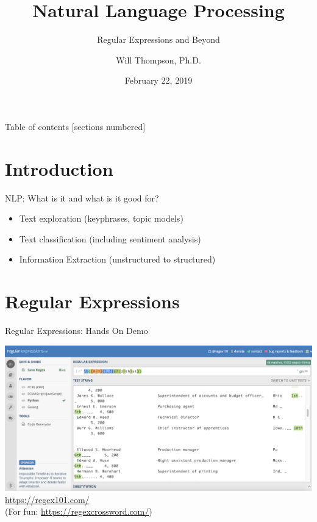 \documentclass[10pt]{beamer}
\title{Natural Language Processing}
\subtitle{Regular Expressions and Beyond}
\date{February 22, 2019}
\author{Will Thompson, Ph.D.}
\begin{document}
\maketitle

\begin{frame}{Table of contents}
  [sections numbered]
  \tableofcontents[hideallsubsections]
\end{frame}

\section{Introduction}

\begin{frame}[fragile]{NLP: What is it and what is it good for?}
\begin{itemize}
  \item Text exploration (keyphrases, topic models)
  \item Text classification (including sentiment analysis)
  \item Information Extraction (unstructured to structured)
\end{itemize}
\end{frame}

\section{Regular Expressions}

\begin{frame}[fragile]{Regular Expressions: Hands On Demo}

\begin{center}
  \includegraphics[scale=0.25]{figures/regex101-screenshot.png}
  \\ \vspace{1em}
  \textcolor{blue}{\url{https://regex101.com/}}
  \\
  (For fun: \textcolor{blue}{\url{https://regexcrossword.com/}})
\end{center}

\end{frame}
\end{document}
